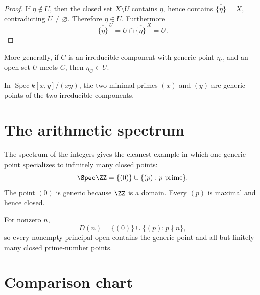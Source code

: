 \begin{proof}
If $\eta\notin U$, then the closed set $X\setminus U$ contains $\eta$, hence contains
$\overline{\{\eta\}}=X$, contradicting $U\neq\varnothing$.  Therefore $\eta\in U$.
Furthermore
\[
\overline{\{\eta\}}^{\,U}
=
U\cap\overline{\{\eta\}}^{\,X}
=
U.
\]
\end{proof}

More generally, if $C$ is an irreducible component with generic point $\eta_C$ and an open
set $U$ meets $C$, then $\eta_C\in U$.

\begin{example}\label{ex:vi09-expand-03}
In $\operatorname{Spec}k[x,y]/(xy)$, the two minimal primes $(x)$ and $(y)$ are generic points of the two irreducible components.
\end{example}
\section{The arithmetic spectrum}

The spectrum of the integers gives the cleanest example in which one generic point
specializes to infinitely many closed points:
\[
\Spec\ZZ=\{(0)\}\cup\{(p):p\text{ prime}\}.
\]
The point $(0)$ is generic because $\ZZ$ is a domain.  Every $(p)$ is maximal and hence
closed.



For nonzero $n$,
\[
D(n)=\{(0)\}\cup\{(p):p\nmid n\},
\]
so every nonempty principal open contains the generic point and all but finitely many closed
prime-number points.

\section{Comparison chart}


